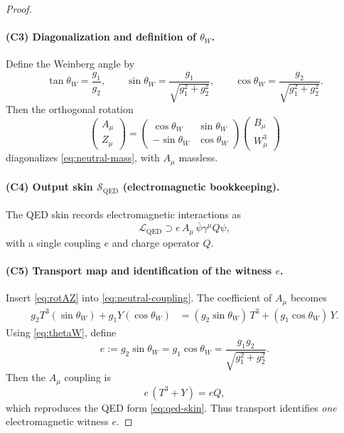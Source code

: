 \documentclass[11pt]{article}
\theoremstyle{remark}
\newcommand{\Skin}{\mathcal{S}}
\begin{document}
\begin{proof}
\paragraph{(C3) Diagonalization and definition of $\theta_W$.}
Define the Weinberg angle by
\begin{equation}\label{eq:thetaW}
\tan\theta_W=\frac{g_1}{g_2},\qquad
\sin\theta_W=\frac{g_1}{\sqrt{g_1^2+g_2^2}},\qquad
\cos\theta_W=\frac{g_2}{\sqrt{g_1^2+g_2^2}}.
\end{equation}
Then the orthogonal rotation
\begin{equation}\label{eq:rotAZ}
\begin{pmatrix} A_\mu \\ Z_\mu\end{pmatrix}
=
\begin{pmatrix}
\cos\theta_W & \sin\theta_W\\
-\sin\theta_W&\cos\theta_W
\end{pmatrix}
\begin{pmatrix} B_\mu\\ W^3_\mu\end{pmatrix}
\end{equation}
diagonalizes \eqref{eq:neutral-mass}, with $A_\mu$ massless.

\paragraph{(C4) Output skin $\Skin_{\mathrm{QED}}$ (electromagnetic bookkeeping).}
The QED skin records electromagnetic interactions as
\begin{equation}\label{eq:qed-skin}
\mathcal{L}_{\mathrm{QED}}\supset e\,A_\mu\,\bar\psi\gamma^\mu Q \psi,
\end{equation}
with a single coupling $e$ and charge operator $Q$.

\paragraph{(C5) Transport map and identification of the witness $e$.}
Insert \eqref{eq:rotAZ} into \eqref{eq:neutral-coupling}.
The coefficient of $A_\mu$ becomes
\begin{align}
g_2 T^3(\sin\theta_W) + g_1 Y(\cos\theta_W)
&=
(g_2\sin\theta_W)\,T^3+(g_1\cos\theta_W)\,Y.
\end{align}
Using \eqref{eq:thetaW}, define
\begin{equation}\label{eq:e-def}
e:=g_2\sin\theta_W=g_1\cos\theta_W=\frac{g_1 g_2}{\sqrt{g_1^2+g_2^2}}.
\end{equation}
Then the $A_\mu$ coupling is
\begin{equation}
e\,(T^3+Y)=eQ,
\end{equation}
which reproduces the QED form \eqref{eq:qed-skin}. Thus transport identifies \emph{one} electromagnetic
witness $e$.


\end{proof}
\end{document}

